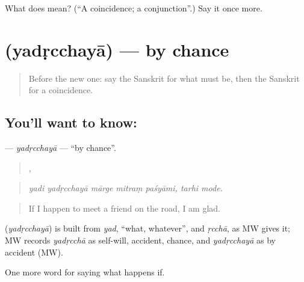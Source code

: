 \begin{tcolorbox}[breakable,colback=teal!4,colframe=teal!35!black,title={Before you move on}]
What does  mean? (\textquotedblleft{}A coincidence; a conjunction\textquotedblright{}.) Say it once more.
\end{tcolorbox}
\section[\texorpdfstring{\sk{यदृच्छया} (yadṛcchayā)}{यदृच्छया (yadṛcchayā)}]{ (yadṛcchayā) — by chance}

\label{lesson:SA-C536-yadrcchaya}



\begin{quote}
Before the new one: say the Sanskrit for what must be, then the Sanskrit for a coincidence.
\end{quote}

\subsection*{You'll want to know: }
\textbf{} — \emph{yadṛcchayā} — \textquotedblleft{}by chance\textquotedblright{}.

\begin{quote}
    ,  
\end{quote}

\begin{quote}
\emph{yadi yadṛcchayā mārge mitraṃ paśyāmi, tarhi mode.}
\end{quote}

\begin{quote}
If I happen to meet a friend on the road, I am glad.
\end{quote}

\begin{cousinweb}
\textbf{} (\emph{yadṛcchayā}) is built from \emph{yad}, \textquotedblleft{}what, whatever\textquotedblright{}, and \emph{ṛcchā}, as MW gives it; MW records \emph{yadṛcchā} as self-will, accident, chance, and \emph{yadṛcchayā} as by accident (MW).
\end{cousinweb}

\begin{grammarlens}[title={What you've built}]
One more word for saying what happens if.
\end{grammarlens}


